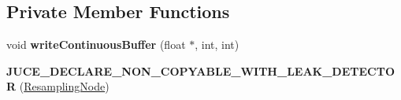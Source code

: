 \subsection*{Private Member Functions}
\begin{DoxyCompactItemize}
\item 
\hypertarget{classResamplingNode_a83436544ad2834b542f804dd5885373f}{void {\bfseries write\-Continuous\-Buffer} (float $\ast$, int, int)}\label{classResamplingNode_a83436544ad2834b542f804dd5885373f}

\item 
\hypertarget{classResamplingNode_a26703f2abf9ffc9cf6a878118e3445cf}{{\bfseries J\-U\-C\-E\-\_\-\-D\-E\-C\-L\-A\-R\-E\-\_\-\-N\-O\-N\-\_\-\-C\-O\-P\-Y\-A\-B\-L\-E\-\_\-\-W\-I\-T\-H\-\_\-\-L\-E\-A\-K\-\_\-\-D\-E\-T\-E\-C\-T\-O\-R} (\hyperlink{classResamplingNode}{Resampling\-Node})}\label{classResamplingNode_a26703f2abf9ffc9cf6a878118e3445cf}

\end{DoxyCompactItemize}
